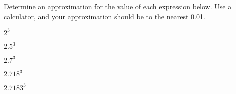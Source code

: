 
\begin{problem}
\item Determine an approximation for the value of each expression
  below. Use a calculator, and your approximation should be to the
  nearest 0.01.
  \begin{subproblem}
  \item $2^{3}$
    \vfill
  \item $2.5^{3}$
    \vfill
  \item $2.7^{3}$
    \vfill
  \item $2.718^{3}$
    \vfill
  \item $2.7183^{3}$
    \vfill
  \end{subproblem}
\end{problem}


